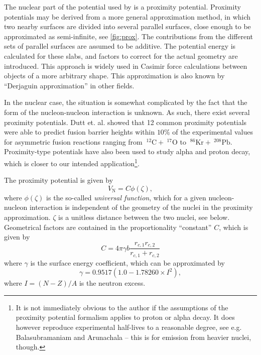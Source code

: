 The nuclear part of the potential used by  is a proximity potential\cite{gollerthan:1988:thesis}\cite{blocki1977}. 
Proximity potentials may be derived from a more general approximation method, in which two nearby surfaces are divided into several parallel surfaces, close enough to be approximated as semi-infinite, see \autoref{fig:prox}\cite{fosco:2012}. The contributions from the different sets of parallel surfaces are assumed to be additive.
The potential energy is calculated for these slabs, and factors to correct for the actual geometry are introduced. This approach is widely used in Casimir force calculations between objects of a more arbitrary shape\cite{fosco:2011}. This approximation is also known by ``Derjaguin approximation'' in other fields\cite{fosco:2012}.

In the nuclear case, the situation is somewhat complicated by the fact that the form of the nucleon-nucleon interaction is unknown. As such, there exist several proximity potentials\cite{dutt:2010}. Dutt et. al. showed that 12 common proximity potentials were able to predict fusion barrier heights within $10\%$ of the experimental values for asymmetric fusion reactions ranging from $~^{12}\mathrm{C} + ~^{17}\mathrm{O}$ to $~^{86}\mathrm{Kr} + ~^{208}\mathrm{Pb}$\cite{dutt:2010}. Proximity-type potentials have also been used to study alpha and proton decay\cite{proton-alpha-proxy:2005}\cite{proton-proxy:2010}, which is closer to our intended application\footnote{It is not immediately obvious to the author if the assumptions of the proximity potential formalism applies to proton or alpha decay. It does however reproduce experimental half-lives to a reasonable degree, see e.g. Balasubramaniam and Arunachala\cite{proton-alpha-proxy:2005} -- this is for emission from heavier nuclei, though.}.

The proximity potential is given by
\begin{equation}
V_\text{N} = C \phi(\zeta),\label{eq:vn}
\end{equation}
where $\phi(\zeta)$ is the so-called \emph{universal function}, which for a given nucleon-nucleon interaction is independent of the geometry of the nuclei in the proximity approximation. $\zeta$ is a unitless distance between the two nuclei, see below. Geometrical factors are contained in the proportionality ``constant'' $C$, which is given by
\begin{equation}
C = 4\pi \gamma b \frac{r_{c,1} r_{c,2}}{r_{c,1} + r_{c,2}}
\end{equation}
where $\gamma$ is the surface energy coefficient, which can be approximated by
\begin{equation}
\gamma= 0.9517 (1.0 - 1.78260 \times I^2),
\end{equation}
where $I=(N-Z)/A$ is the neutron excess.

